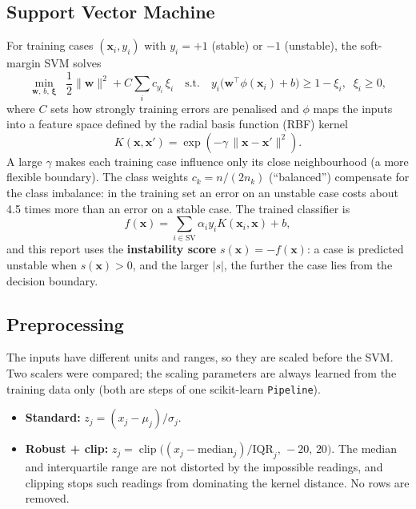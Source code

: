 \documentclass[11pt,a4paper]{article}
\newcommand{\code}[1]{\texttt{#1}}
\begin{document}
\subsection{Support Vector Machine}
For training cases $(\mathbf{x}_i, y_i)$ with $y_i = +1$ (stable) or $-1$ (unstable), the soft-margin SVM solves
\begin{equation}
  \min_{\mathbf{w},\, b,\, \boldsymbol{\xi}} \;\; \frac{1}{2}\lVert \mathbf{w} \rVert^2
  + C \sum_{i} c_{y_i}\, \xi_i
  \quad \text{s.t.} \quad y_i\bigl(\mathbf{w}^\top \phi(\mathbf{x}_i) + b\bigr) \ge 1 - \xi_i,\;\; \xi_i \ge 0,
\end{equation}
where $C$ sets how strongly training errors are penalised and $\phi$ maps the inputs into a feature space defined by
the radial basis function (RBF) kernel
\begin{equation}
  K(\mathbf{x}, \mathbf{x}') = \exp\!\left(-\gamma\, \lVert \mathbf{x} - \mathbf{x}' \rVert^2\right).
\end{equation}
A large $\gamma$ makes each training case influence only its close neighbourhood (a more flexible boundary).
The class weights $c_k = n / (2 n_k)$ (``balanced'') compensate for the class imbalance: in the training set an error
on an unstable case costs about 4.5 times more than an error on a stable case. The trained classifier is
\begin{equation}
  f(\mathbf{x}) = \sum_{i \in \mathrm{SV}} \alpha_i y_i K(\mathbf{x}_i, \mathbf{x}) + b,
\end{equation}
and this report uses the \textbf{instability score} $s(\mathbf{x}) = -f(\mathbf{x})$: a case is predicted unstable when
$s(\mathbf{x}) > 0$, and the larger $|s|$, the further the case lies from the decision boundary.

\subsection{Preprocessing}
The inputs have different units and ranges, so they are scaled before the SVM. Two scalers were compared; the
scaling parameters are always learned from the training data only (both are steps of one scikit-learn
\code{Pipeline}).
\begin{itemize}
  \item \textbf{Standard:} $z_j = (x_j - \mu_j)/\sigma_j$.
  \item \textbf{Robust + clip:} $z_j = \operatorname{clip}\bigl((x_j - \mathrm{median}_j)/\mathrm{IQR}_j,\,-20,\,20\bigr)$.
        The median and interquartile range are not distorted by the impossible readings, and clipping stops such
        readings from dominating the kernel distance. No rows are removed.
\end{itemize}
\end{document}
